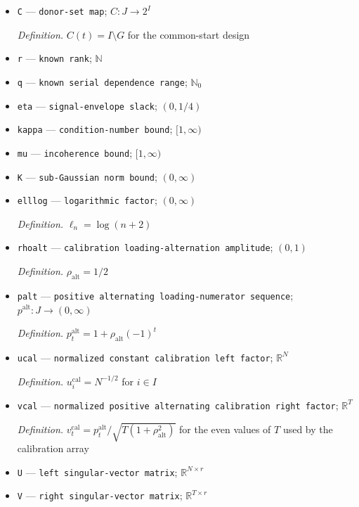\documentclass{article}
\begin{document}
\begin{itemize}
  \par\smallskip\noindent\emph{Definition.} \(H=|W|\)
  \item \texttt{C} --- \texttt{donor-\allowbreak{}set map}; \(C:J\to 2^I\)
  \par\smallskip\noindent\emph{Definition.} \(C(t)=I\setminus G\) for the common-start design
  \item \texttt{r} --- \texttt{known rank}; \(\mathbb N\)
  \item \texttt{q} --- \texttt{known serial dependence range}; \(\mathbb N_0\)
  \item \texttt{eta} --- \texttt{signal-\allowbreak{}envelope slack}; \((0,1/4)\)
  \item \texttt{kappa} --- \texttt{condition-\allowbreak{}number bound}; \([1,\infty)\)
  \item \texttt{mu} --- \texttt{incoherence bound}; \([1,\infty)\)
  \item \texttt{K} --- \texttt{sub-\allowbreak{}Gaussian norm bound}; \((0,\infty)\)
  \item \texttt{elllog} --- \texttt{logarithmic factor}; \((0,\infty)\)
  \par\smallskip\noindent\emph{Definition.} \(\ell_n=\log(n+2)\)
  \item \texttt{rhoalt} --- \texttt{calibration loading-\allowbreak{}alternation amplitude}; \((0,1)\)
  \par\smallskip\noindent\emph{Definition.} \(\rho_{\mathrm{alt}}=1/2\)
  \item \texttt{palt} --- \texttt{positive alternating loading-\allowbreak{}numerator sequence}; \(p^{\mathrm{alt}}:J\to(0,\infty)\)
  \par\smallskip\noindent\emph{Definition.} \(p^{\mathrm{alt}}_t=1+\rho_{\mathrm{alt}}(-1)^t\)
  \item \texttt{ucal} --- \texttt{normalized constant calibration left factor}; \(\mathbb R^N\)
  \par\smallskip\noindent\emph{Definition.} \(u^{\mathrm{cal}}_i=N^{-1/2}\) for \(i\in I\)
  \item \texttt{vcal} --- \texttt{normalized positive alternating calibration right factor}; \(\mathbb R^T\)
  \par\smallskip\noindent\emph{Definition.} \(v^{\mathrm{cal}}_t=p^{\mathrm{alt}}_t/\sqrt{T(1+\rho_{\mathrm{alt}}^2)}\) for the even values of \(T\) used by the calibration array
  \item \texttt{U} --- \texttt{left singular-\allowbreak{}vector matrix}; \(\mathbb R^{N\times r}\)
  \item \texttt{V} --- \texttt{right singular-\allowbreak{}vector matrix}; \(\mathbb R^{T\times r}\)

\end{itemize}
\end{document}
